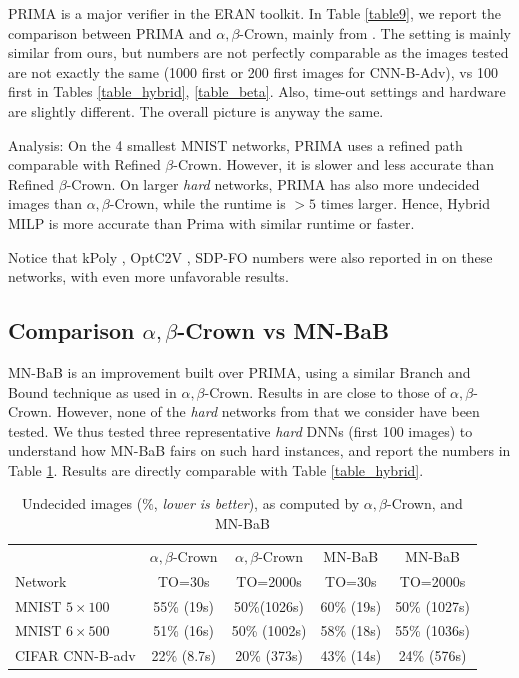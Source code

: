{	PRIMA \cite{prima} is a major verifier in the ERAN toolkit. In Table \ref{table9}, we report the comparison between PRIMA and $\alpha,\beta$-Crown, mainly from \cite{crown}. The setting is mainly similar from ours, but numbers are not perfectly comparable as the images tested are not  exactly the same (1000 first or 200 first images for CNN-B-Adv), vs 100 first in Tables \ref{table_hybrid}, \ref{table_beta}. Also, time-out settings and hardware are slightly different. The overall picture is anyway the same.


Analysis: On the 4 smallest MNIST networks, PRIMA uses a refined path comparable with Refined $\beta$-Crown. However, it is slower and less accurate than Refined $\beta$-Crown.
On larger {\em hard} networks, PRIMA has also more undecided images than $\alpha,\beta$-Crown, while the runtime is $>5$ times larger.
Hence, Hybrid MILP is more accurate than Prima with similar runtime or faster.

Notice that kPoly \cite{kpoly}, OptC2V \cite{optC2V}, SDP-FO \cite{SDPFI} numbers were also reported in \cite{crown} on these networks, with even more unfavorable results.

\subsection*{Comparison $\alpha,\beta$-Crown vs MN-BaB}

MN-BaB \cite{ferrari2022complete} is an improvement built over PRIMA, using a similar Branch and Bound technique as used in $\alpha,\beta$-Crown. Results in \cite{ferrari2022complete}
are close to those of $\alpha,\beta$-Crown. However, none of the {\em hard} networks from \cite{crown} that we consider have been tested. We thus tested three representative {\em hard} DNNs (first 100 images) to understand how MN-BaB fairs on such hard instances, and report the numbers in Table \ref{table10}. Results are directly comparable with Table \ref{table_hybrid}.


\begin{table}[h!]
	\centering
	\begin{tabular}{||l||c|c||c|c||}
		\hline \hline
		 & $\alpha,\beta$-Crown & $\alpha,\beta$-Crown & MN-BaB & MN-BaB \\ 
		 Network & TO=30s & TO=2000s &  TO=30s & TO=2000s \\ 
		\hline
		MNIST $5 \times 100$ & 55\% (19s) & 50\%(1026s) & 60\% (19s) & 50\% (1027s) \\ \hline
		MNIST $6 \times 500$ & 51\% (16s) & 50\% (1002s) & 58\% (18s) & 55\% (1036s) \\ \hline
		CIFAR CNN-B-adv & 22\% (8.7s) & 20\% (373s) & 43\% (14s) & 24\% (576s) \\ \hline 
	\end{tabular}
	\caption{Undecided images ($\%$, {\em lower is better}), as computed by $\alpha,\beta$-Crown, and MN-BaB}
	\label{table10}
\end{table}

}
